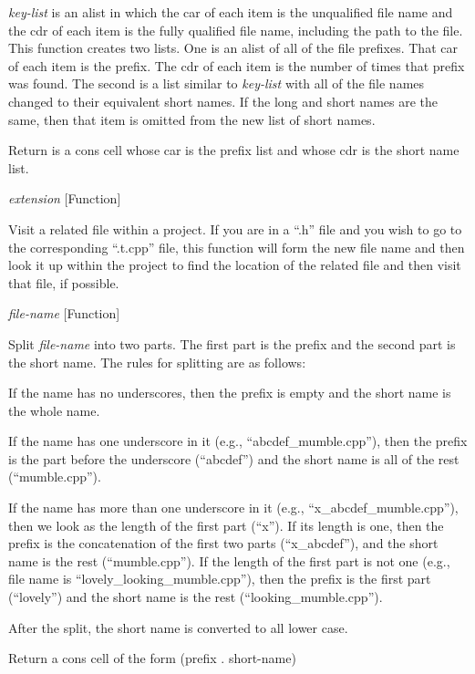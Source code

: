 \begin{doc-string}
\emph{key-list} is an alist in which the car of each item is the unqualified file
name and the cdr of each item is the fully qualified file name, including the
path to the file.  This function creates two lists.  One is an alist of all of
the file prefixes.  That car of each item is the prefix.  The cdr of each item
is the number of times that prefix was found.  The second is a list similar to
\emph{key-list} with all of the file names changed to their equivalent short names.  If
the long and short names are the same, then that item is omitted from the new
list of short names.

Return is a cons cell whose car is the prefix list and whose cdr is the short
name list.
\end{doc-string}

\vspace{1em}
\noindent
{}
\usebox{\funcname}\emph{extension}
 \hfill [Function]

\begin{doc-string}
Visit a related file within a project.  If you are in a ``.h'' file and you
wish to go to the corresponding ``.t.cpp'' file, this function will form the new
file name and then look it up within the project to find the location of the
related file and then visit that file, if possible.
\end{doc-string}

\vspace{1em}
\noindent
{}
\usebox{\funcname}\emph{file-name}
 \hfill [Function]

\begin{doc-string}
Split \emph{file-name} into two parts.  The first part is the prefix and the second
part is the short name.  The rules for splitting are as follows:

If the name has no underscores, then the prefix is empty and the short name is
the whole name.

If the name has one underscore in it (e.g., ``abcdef\_mumble.cpp''), then the
prefix is the part before the underscore (``abcdef'') and the short name is all
of the rest (``mumble.cpp'').

If the name has more than one underscore in it (e.g., ``x\_abcdef\_mumble.cpp''),
then we look as the length of the first part (``x'').  If its length is one,
then the prefix is the concatenation of the first two parts (``x\_abcdef''), and
the short name is the rest (``mumble.cpp'').  If the length of the first part is
not one (e.g., file name is ``lovely\_looking\_mumble.cpp''), then the prefix is
the first part (``lovely'') and the short name is the rest
(``looking\_mumble.cpp'').

After the split, the short name is converted to all lower case.

Return a cons cell of the form (prefix . short-name)
\end{doc-string}

